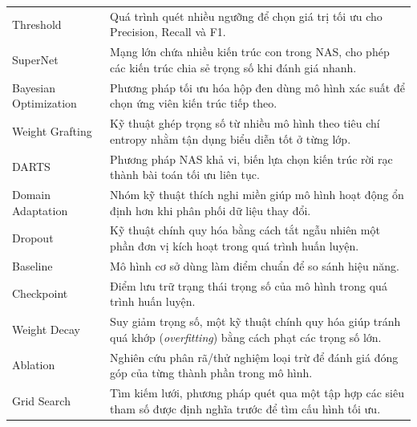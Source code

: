 {\begin{longtable}{L{4.2cm}L{8.8cm}}
Threshold & Quá trình quét nhiều ngưỡng để chọn giá trị tối ưu cho Precision, Recall và F1. \\
SuperNet & Mạng lớn chứa nhiều kiến trúc con trong NAS, cho phép các kiến trúc chia sẻ trọng số khi đánh giá nhanh. \\
Bayesian Optimization & Phương pháp tối ưu hóa hộp đen dùng mô hình xác suất để chọn ứng viên kiến trúc tiếp theo. \\
Weight Grafting & Kỹ thuật ghép trọng số từ nhiều mô hình theo tiêu chí entropy nhằm tận dụng biểu diễn tốt ở từng lớp. \\
DARTS & Phương pháp NAS khả vi, biến lựa chọn kiến trúc rời rạc thành bài toán tối ưu liên tục. \\
Domain Adaptation & Nhóm kỹ thuật thích nghi miền giúp mô hình hoạt động ổn định hơn khi phân phối dữ liệu thay đổi. \\
Dropout & Kỹ thuật chính quy hóa bằng cách tắt ngẫu nhiên một phần đơn vị kích hoạt trong quá trình huấn luyện. \\
Baseline & Mô hình cơ sở dùng làm điểm chuẩn để so sánh hiệu năng. \\
Checkpoint & Điểm lưu trữ trạng thái trọng số của mô hình trong quá trình huấn luyện. \\
Weight Decay & Suy giảm trọng số, một kỹ thuật chính quy hóa giúp tránh quá khớp (\textit{overfitting}) bằng cách phạt các trọng số lớn. \\
Ablation & Nghiên cứu phân rã/thử nghiệm loại trừ để đánh giá đóng góp của từng thành phần trong mô hình. \\
Grid Search & Tìm kiếm lưới, phương pháp quét qua một tập hợp các siêu tham số được định nghĩa trước để tìm cấu hình tối ưu. \\
\bottomrule
\end{longtable}
}
